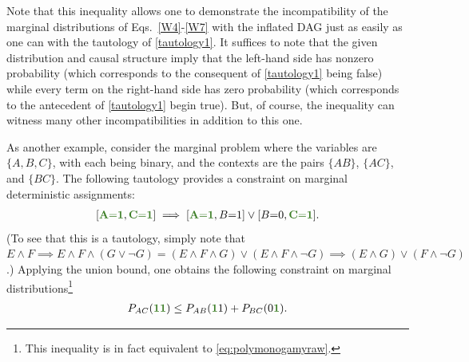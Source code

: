 Note that this inequality allows one to demonstrate the incompatibility of the marginal distributions of Eqs.~\eqref{W4}-\eqref{W7} with the inflated DAG just as easily as one can with the tautology of \cref{tautology1}.  It suffices to note that the given distribution and causal structure imply that the left-hand side has nonzero probability (which corresponds to the consequent of \cref{tautology1} being false) while every term on the right-hand side has zero probability (which corresponds to the antecedent of  \cref{tautology1} begin true).
But, of course, the inequality can witness many other incompatibilities in addition to this one.


As another example, consider the marginal problem where the variables are $\{ A,B,C\}$, with each being binary, and the contexts are the pairs $\{AB\}$, $\{AC\}$, and $\{BC\}$.  
The following tautology provides a constraint on marginal deterministic assignments:
\begin{align}
 \bracks{\mgreen{A \eql 1}, \mgreen{C \eql 1}} \implies \bracks{\mgreen{A \eql 1}, B \eql 1} \lor \bracks{B \eql 0, \mgreen{C \eql 1}}.
\end{align}
(To see that this is a tautology, simply note that $E \land F  \implies  E \land F \land (G \lor \lnot G) = (E \land F \land G) \lor (E\land F \land \lnot G) \implies (E \land G) \lor (F \land \lnot G)$.) 
Applying the union bound, one obtains the following constraint on marginal distributions\footnote{This inequality is in fact equivalent to \cref{eq:polymonogamyraw}.}
\begin{align}\label{eq:trivmarginalconstraint}
	P_{AC}(\mgreen{1 1}) \leq P_{AB}(\mgreen{1} 1) + P_{BC}(0 \mgreen{1}).
\end{align}


